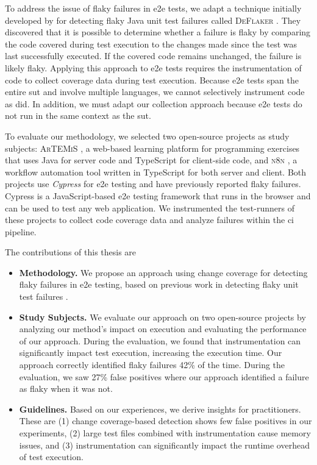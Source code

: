 To address the issue of flaky failures in \ac{e2e} tests, we adapt a technique initially developed by \citeauthor*{bell_deflaker_2018} for detecting flaky Java unit test failures called \textsc{DeFlaker} \autocite{bell_deflaker_2018}.
They discovered that it is possible to determine whether a failure is flaky by comparing the code covered during test execution to the changes made since the test was last successfully executed.
If the covered code remains unchanged, the failure is likely flaky.
Applying this approach to \ac{e2e} tests requires the instrumentation of code to collect coverage data during test execution.
Because \ac{e2e} tests span the entire \ac{sut} and involve multiple languages, we cannot selectively instrument code as \citeauthor*{bell_deflaker_2018} did.
In addition, we must adapt our collection approach because \ac{e2e} tests do not run in the same context as the \ac{sut}.

To evaluate our methodology, we selected two open-source projects as study subjects:
\textsc{ArTEMiS} \autocite{krusche_artemis_2018}, a web-based learning platform for programming exercises that uses Java for server code and TypeScript for client-side code, and \textsc{n8n} \autocite{noauthor_n8n_2023}, a workflow automation tool written in TypeScript for both server and client.
Both projects use \textit{Cypress} \autocite{noauthor_cypress-iocypress_2023} for \ac{e2e} testing and have previously reported flaky failures.
Cypress is a JavaScript-based \ac{e2e} testing framework that runs in the browser and can be used to test any web application.
We instrumented the test-runners of these projects to collect code coverage data and analyze failures within the \ac{ci} pipeline.

The contributions of this thesis are
\begin{itemize}
	\item \textbf{Methodology.} We propose an approach using change coverage for detecting flaky failures in \ac{e2e} testing, based on previous work in detecting flaky unit test failures \autocite{bell_deflaker_2018}.
	\item \textbf{Study Subjects.} We evaluate our approach on two open-source projects by analyzing our method's impact on execution and evaluating the performance of our approach.
	      During the evaluation, we found that instrumentation can significantly impact test execution, increasing the execution time.
	      Our approach correctly identified flaky failures 42\% of the time.
	      During the evaluation, we saw 27\% false positives where our approach identified a failure as flaky when it was not.
	\item \textbf{Guidelines.} Based on our experiences, we derive insights for practitioners. These are
	      (1) change coverage-based detection shows few false positives in our experiments,
	      (2) large test files combined with instrumentation cause memory issues, and
	      (3) instrumentation can significantly impact the runtime overhead of test execution.
\end{itemize}

